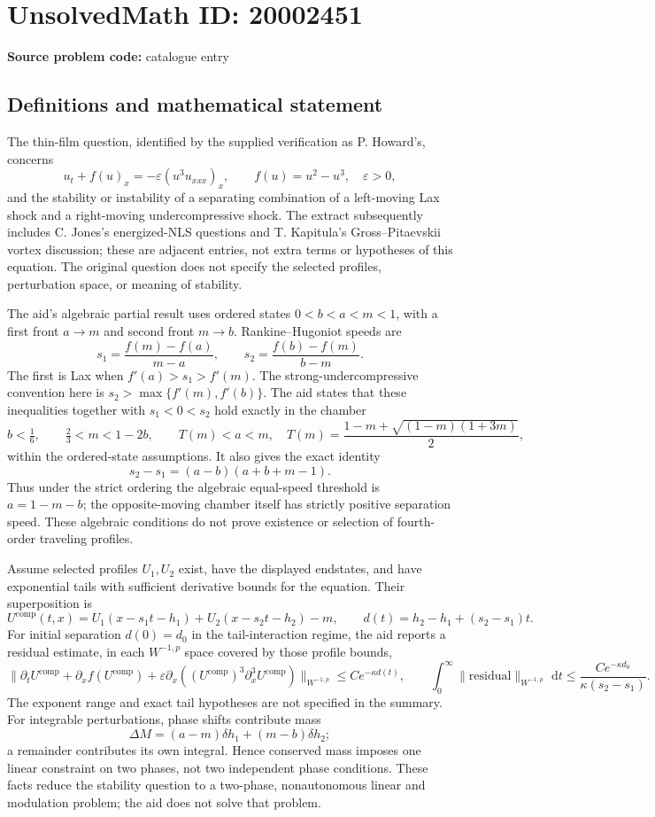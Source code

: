 \documentclass[11pt]{article}
\newcommand{\eps}{\varepsilon}
\newcommand{\dd}{\,\mathrm{d}}
\begin{document}
\section*{UnsolvedMath ID: 20002451}
\textbf{Source problem code:} catalogue entry
\subsection{Definitions and mathematical statement}
The thin-film question, identified by the supplied verification as P. Howard's, concerns
\[
 u_t+f(u)_x=-\eps(u^3u_{xxx})_x,\qquad f(u)=u^2-u^3,\quad \eps>0,
\]
and the stability or instability of a separating combination of a left-moving Lax shock and a right-moving undercompressive shock. The extract subsequently includes C. Jones's energized-NLS questions and T. Kapitula's Gross--Pitaevskii vortex discussion; these are adjacent entries, not extra terms or hypotheses of this equation. The original question does not specify the selected profiles, perturbation space, or meaning of stability.

The aid's algebraic partial result uses ordered states $0<b<a<m<1$, with a first front $a\to m$ and second front $m\to b$. Rankine--Hugoniot speeds are
\[
 s_1=\frac{f(m)-f(a)}{m-a},\qquad s_2=\frac{f(b)-f(m)}{b-m}.
\]
The first is Lax when $f'(a)>s_1>f'(m)$. The strong-undercompressive convention here is $s_2>\max\{f'(m),f'(b)\}$. The aid states that these inequalities together with $s_1<0<s_2$ hold exactly in the chamber
\[
 b<\tfrac16,\qquad \tfrac23<m<1-2b,\qquad
 T(m)<a<m,\quad
 T(m)=\frac{1-m+\sqrt{(1-m)(1+3m)}}2,
\]
within the ordered-state assumptions. It also gives the exact identity
\[
 s_2-s_1=(a-b)(a+b+m-1).
\]
Thus under the strict ordering the algebraic equal-speed threshold is $a=1-m-b$; the opposite-moving chamber itself has strictly positive separation speed. These algebraic conditions do not prove existence or selection of fourth-order traveling profiles.

Assume selected profiles $U_1,U_2$ exist, have the displayed endstates, and have exponential tails with sufficient derivative bounds for the equation. Their superposition is
\[
 U^{\mathrm{comp}}(t,x)=U_1(x-s_1t-h_1)+U_2(x-s_2t-h_2)-m,
 \qquad d(t)=h_2-h_1+(s_2-s_1)t.
\]
For initial separation $d(0)=d_0$ in the tail-interaction regime, the aid reports a residual estimate, in each $W^{-1,p}$ space covered by those profile bounds,
\[
 \|\partial_tU^{\mathrm{comp}}+\partial_xf(U^{\mathrm{comp}})
 +\eps\partial_x((U^{\mathrm{comp}})^3\partial_x^3U^{\mathrm{comp}})\|_{W^{-1,p}}
 \le C e^{-\kappa d(t)},\qquad
 \int_0^\infty\|\text{residual}\|_{W^{-1,p}}\,\dd t
 \le\frac{C e^{-\kappa d_0}}{\kappa(s_2-s_1)}.
\]
The exponent range and exact tail hypotheses are not specified in the summary. For integrable perturbations, phase shifts contribute mass
\[
 \Delta M=(a-m)\delta h_1+(m-b)\delta h_2;
\]
a remainder contributes its own integral. Hence conserved mass imposes one linear constraint on two phases, not two independent phase conditions. These facts reduce the stability question to a two-phase, nonautonomous linear and modulation problem; the aid does not solve that problem.
\end{document}
